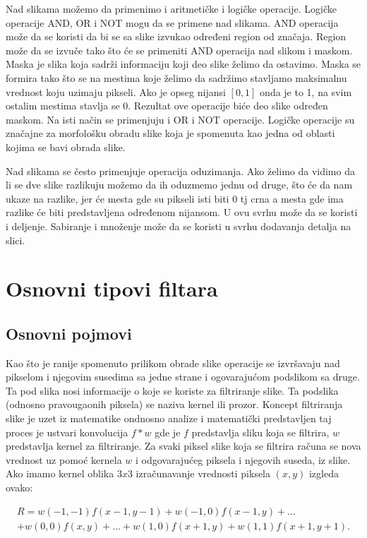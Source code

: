 \documentclass[a4paper,12pt,titlepage]{article}
\begin{document}
Nad slikama možemo da primenimo i aritmetičke i logičke operacije. Logičke operacije AND, OR i NOT mogu da se primene nad slikama. AND operacija može da se koristi da bi se sa slike izvukao određeni region od značaja. Region može da se izvuče tako što će se primeniti AND operacija nad slikom i maskom. Maska je slika koja sadrži informaciju koji deo slike želimo da ostavimo. Maska se formira tako što se na mestima koje želimo da sadržimo stavljamo maksimalnu vrednost koju uzimaju pikseli. Ako je opseg nijansi $[0, 1]$ onda je to 1, na svim ostalim mestima stavlja se 0. Rezultat ove operacije biće deo slike određen maskom. Na isti način se primenjuju i OR i NOT operacije. Logičke operacije su značajne za morfološku obradu slike koja je spomenuta kao jedna od oblasti kojima se bavi obrada slike. 

Nad slikama se često primenjuje operacija oduzimanja. Ako želimo da vidimo da li se dve slike razlikuju možemo da ih oduzmemo jednu od druge, što će da nam ukaze na razlike, jer će mesta gde su pikseli isti biti 0 tj crna a mesta gde ima razlike će biti predstavljena određenom nijansom. U ovu svrhu može da se koristi i deljenje. Sabiranje i množenje može da se koristi u svrhu dodavanja detalja na slici.

\section{Osnovni tipovi filtara}%

\subsection{Osnovni pojmovi}%

Kao što je ranije spomenuto prilikom obrade slike operacije se izvršavaju nad pikselom i njegovim susedima sa jedne strane i ogovarajućom podslikom sa druge. Ta pod slika nosi informacije o koje se koriste za filtriranje slike. Ta podslika (odnosno pravougaonih piksela) se naziva kernel ili prozor. Koncept filtriranja slike je uzet iz matematike ondnosno analize i matematički predstavljen taj proces je ustvari konvolucija $f * w$ gde je $f$ predstavlja sliku koja se filtrira, $w$ predstavlja kernel za filtriranje. Za svaki piksel slike koja se filtrira računa se nova vrednost uz pomoć kernela $w$ i odgovarajućeg piksela i njegovih suseda, iz slike. Ako imamo kernel oblika $3 x 3$ izračunavanje vrednosti piksela $(x, y)$ izgleda ovako:

\begin{equation}\label{eq:conv1}
\begin{split}
R = w(-1, -1)f(x - 1, y - 1) + w(-1, 0)f(x - 1, y) + \dots \\
+ w(0, 0)f(x, y) + \dots + w(1, 0)f(x + 1, y) + w(1, 1)f(x + 1, y + 1).
\end{split}
\end{equation}
\end{document}

